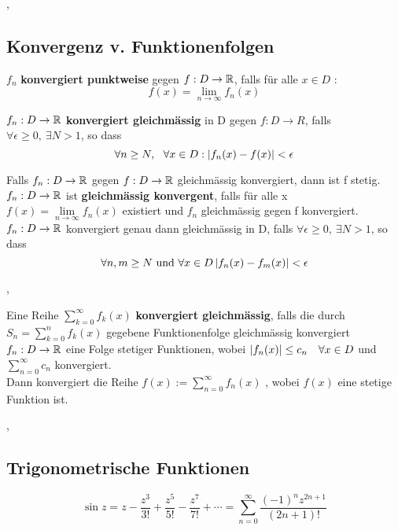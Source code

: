\sep

\subsection{Konvergenz v. Funktionenfolgen}

\Def[3.7.1] $f_n$ \textbf{konvergiert punktweise} gegen ${f : D \rightarrow \mathbb{R}}$, falls für alle $x \in D$ :
\[f(x) =  \lim\limits_{n \rightarrow \infty} f_n(x) \]
 
\Def[3.7.3] $f_n : D \rightarrow \mathbb{R}$ \textbf{konvergiert gleichmässig} in D gegen $f : D \rightarrow R$, falls $ \forall \epsilon \geq 0, \ \exists N > 1$, so dass
\[\forall n \geq N, \ \ \forall x \in D : \left\lvert f_n(x) - f(x) \right\rvert < \epsilon \]

\Satz[3.7.4] Falls $f_n : D \rightarrow \mathbb{R}$ gegen $f : D \rightarrow \mathbb{R}$ gleichmässig konvergiert, dann ist f stetig. \\

\Satz[3.7.5] $f_n : D \rightarrow \mathbb{R}$ ist \textbf{gleichmässig konvergent}, falls für alle x $f(x) = \lim\limits_{n \rightarrow \infty} f_n(x)$ existiert
und $f_n$ gleichmässig gegen f konvergiert. \\

\Korollar[3.7.6] $f_n : D \rightarrow \mathbb{R}$ konvergiert genau dann gleichmässig in D, falls $ \forall \epsilon \geq 0, \ \exists N > 1$, so dass
\[\forall n, m \geq N \text{ und } \forall x \in D \left\lvert f_n(x) - f_m(x) \right\rvert < \epsilon \]

\sep 

\Def[3.7.8] Eine Reihe $\sum_{k=0}^{\infty} f_k (x)$ \textbf{konvergiert gleichmässig}, falls die durch ${S_n = \sum_{k=0}^{n} f_k (x)}$ gegebene Funktionenfolge gleichmässig konvergiert \\

\Def[3.7.9] $f_n :  D \rightarrow \mathbb{R}$ eine Folge stetiger Funktionen, wobei $\left\lvert f_n (x) \right\rvert \leq c_n \quad \forall x \in D$ und $\sum_{n=0}^\infty c_n$ konvergiert. \\ Dann konvergiert die Reihe $f(x) := \sum_{n=0}^\infty f_n(x)$ , wobei $f(x)$ eine stetige Funktion ist. 

\sep

\subsection{Trigonometrische Funktionen}

\[\sin z = z - \frac{z^3}{3!} + \frac{z^5}{5!} - \frac{z^7}{7!} + \cdots = \sum_{n=0}^\infty \frac{(-1)^n z^{2n + 1}}{(2n + 1)!} \]

